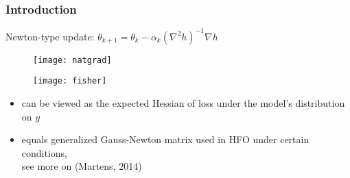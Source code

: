 \begin{frame}
\frametitle{Introduction}
Newton-type update: $\theta_{k+1} = \theta_k - \alpha_k (\nabla^2 h)^{-1} \nabla h$
\begin{figure}
    \raggedright
    \texttt{[image: natgrad]}
\end{figure}

\begin{figure}
    \raggedright
    \texttt{[image: fisher]}
\end{figure}

{\footnotesize
\begin{itemize}
    \item can be viewed as the expected Hessian of loss under the model's distribution on $y$
    \item equals generalized Gauss-Newton matrix used in HFO under certain conditions, \\
        see more on (Martens, 2014)
\end{itemize}
}

\end{frame}
